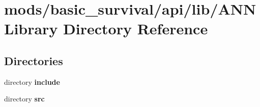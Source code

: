 \section{mods/basic\+\_\+survival/api/lib/\+A\+N\+N\+Library Directory Reference}
\label{dir_c08a01baf9069a9149e0e856d0cb24b3}
\subsection*{Directories}
\begin{DoxyCompactItemize}
\item 
directory {\bf include}
\item 
directory {\bf src}
\end{DoxyCompactItemize}
